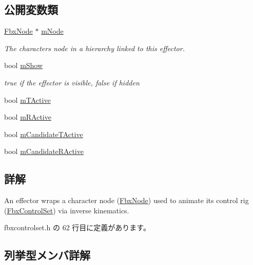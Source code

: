 \subsection*{公開変数類}
\begin{DoxyCompactItemize}
\item 
\hyperlink{class_fbx_node}{Fbx\+Node} $\ast$ \hyperlink{class_fbx_effector_ab039944d84107c7d17eef8b6915853f0}{m\+Node}
\begin{DoxyCompactList}\small\item\em The character\textquotesingle{}s node in a hierarchy linked to this effector. \end{DoxyCompactList}\item 
bool \hyperlink{class_fbx_effector_aea6c24780611a7878ed22d9358715e25}{m\+Show}
\begin{DoxyCompactList}\small\item\em {\ttfamily true} if the effector is visible, {\ttfamily false} if hidden \end{DoxyCompactList}\item 
bool \hyperlink{class_fbx_effector_ab4cb3feccf5586307ec12f9c208d256b}{m\+T\+Active}
\item 
bool \hyperlink{class_fbx_effector_a6a37a72600a06dba114a47d6c98731c7}{m\+R\+Active}
\item 
bool \hyperlink{class_fbx_effector_a624821039f6696c381004a85d2fdc237}{m\+Candidate\+T\+Active}
\item 
bool \hyperlink{class_fbx_effector_a12e10ffdcf48e38d2893623696ce188d}{m\+Candidate\+R\+Active}
\end{DoxyCompactItemize}


\subsection{詳解}
An effector wraps a character node (\hyperlink{class_fbx_node}{Fbx\+Node}) used to animate its control rig (\hyperlink{class_fbx_control_set}{Fbx\+Control\+Set}) via inverse kinematics. 

 fbxcontrolset.\+h の 62 行目に定義があります。



\subsection{列挙型メンバ詳解}
\mbox{\label{class_fbx_effector_a26afd81fd3d41431311004c16536e739}} 
